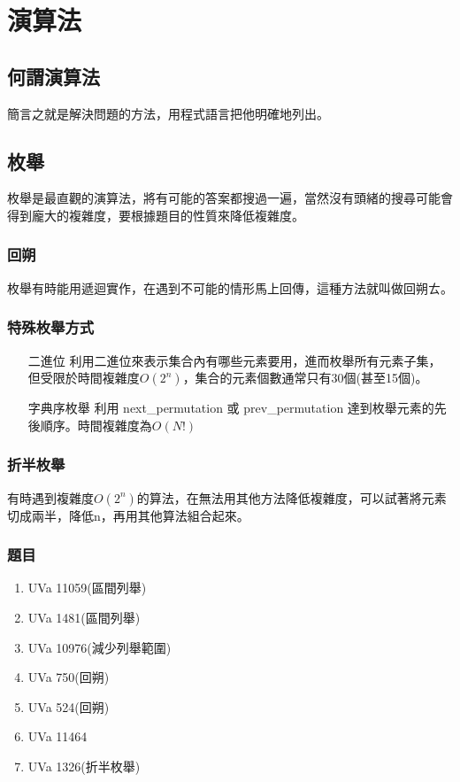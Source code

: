 \section{演算法}
\subsection{何謂演算法}
簡言之就是解決問題的方法，用程式語言把他明確地列出。
\subsection{枚舉}
枚舉是最直觀的演算法，將有可能的答案都搜過一遍，當然沒有頭緒的搜尋可能會得到龐大的複雜度，要根據題目的性質來降低複雜度。
\subsubsection{回朔}
枚舉有時能用遞迴實作，在遇到不可能的情形馬上回傳，這種方法就叫做回朔ㄊ。
\subsubsection{特殊枚舉方式}
\begin{enumerate}
\item [二進位] 利用二進位來表示集合內有哪些元素要用，進而枚舉所有元素子集，但受限於時間複雜度$O(2^n)$，集合的元素個數通常只有30個(甚至15個)。   
\item [字典序枚舉] 利用 next\_permutation 或 prev\_permutation 達到枚舉元素的先後順序。時間複雜度為$O(N!)$
\end{enumerate}
\subsubsection{折半枚舉}
有時遇到複雜度$O(2^n)$的算法，在無法用其他方法降低複雜度，可以試著將元素切成兩半，降低n，再用其他算法組合起來。
\subsubsection{題目}
\begin{enumerate}
\item UVa 11059(區間列舉)
\item UVa 1481(區間列舉)
\item UVa 10976(減少列舉範圍)
\item UVa 750(回朔)
\item UVa 524(回朔)
\item UVa 11464
\item UVa 1326(折半枚舉)
\end{enumerate}
